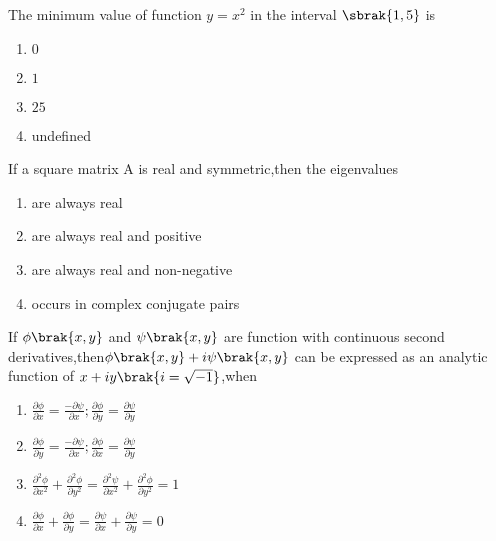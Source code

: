\iffalse
\chapter{2007}
\author{AI24BETCH11032}
\section{me}
\fi

\item The minimum  value of function $y=x^{2}$ in the interval $\sbrak{1,5}$ is 
\begin{multicols}{4}
    \begin{enumerate}
        \item $0$
        \item $1$
        \item $25$
        \item undefined
    \end{enumerate}
\end{multicols}
\bigskip
\item If a square matrix A is real and symmetric,then the eigenvalues 
\begin{enumerate}
        \item are always real
        \item are always real and positive 
        \item are always real and non-negative
        \item occurs in complex conjugate pairs
 \end{enumerate}
\bigskip
\item If $\phi\brak{x,y}$ and $\psi\brak{x,y}$ are function with continuous  second derivatives,then$\phi\brak{x,y}+i\psi\brak{x,y}$ can be expressed as an analytic function of $x+iy\brak{i=\sqrt{-1}}$,when
\begin{enumerate}
        \item $\frac{\partial\phi}{\partial x}=\frac{-\partial\psi}{\partial x};\frac{\partial\phi}{\partial y}=\frac{\partial\psi}{\partial y}$
        \item $\frac{\partial\phi}{\partial y}=\frac{-\partial\psi}{\partial x};\frac{\partial\phi}{\partial x}=\frac{\partial\psi}{\partial y}$
        \item $\frac{\partial^{2}\phi}{\partial x^{2}}+\frac{\partial^{2}\phi}{\partial y^{2}}=\frac{\partial^{2}\psi}{\partial x^{2}}+\frac{\partial^{2}\phi}{\partial y^{2}}=1$
        \item$\frac{\partial\phi}{\partial x}+\frac{\partial\phi}{\partial y}=\frac{\partial\psi}{\partial x}+\frac{\partial\psi}{\partial y}=0$
\end{enumerate}
